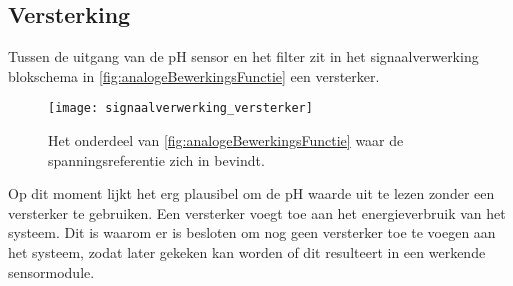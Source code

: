 \subsection{Versterking}\label{sec:versterking}
Tussen de uitgang van de pH sensor en het filter zit in het signaalverwerking blokschema in \cref{fig:analogeBewerkingsFunctie} een versterker.

\begin{figure}[!htbp]
    \centering
    \texttt{[image: signaalverwerking\_versterker]}
    \caption{Het onderdeel van \cref{fig:analogeBewerkingsFunctie} waar de spanningsreferentie zich in bevindt.}
    \label{fig:versterkerInSchema}
\end{figure}

Op dit moment lijkt het erg plausibel om de pH waarde uit te lezen zonder een versterker te gebruiken. Een versterker voegt toe aan het energieverbruik van het systeem. Dit is waarom er is besloten om nog geen versterker toe te voegen aan het systeem, zodat later gekeken kan worden of dit resulteert in een werkende sensormodule.